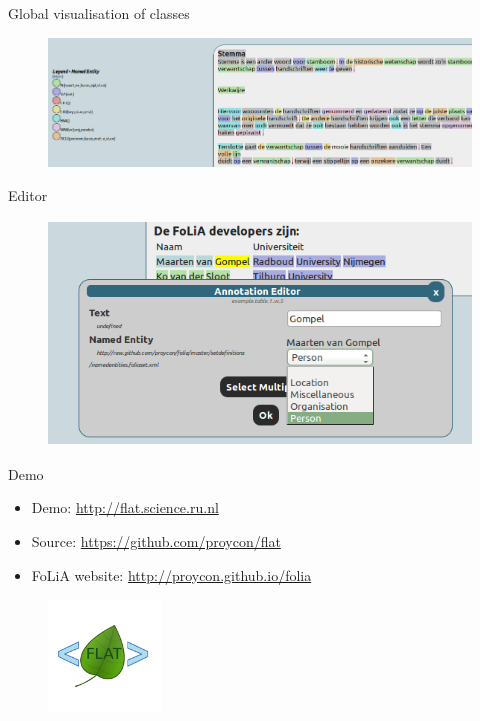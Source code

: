 \documentclass[xcolor=table,10pt,t]{beamer}
\begin{document}
\begin{frame}{Global visualisation of classes}
  \begin{figure}
        \includegraphics[width=15cm]{highlight2.png}
    \end{figure}
\end{frame}

\begin{frame}{Editor}
  \begin{figure}
        \includegraphics[height=6cm]{edit2.png}
    \end{figure}
\end{frame}

\begin{frame}{Demo}
  \begin{block}{}
      \begin{itemize}
        \item Demo: \url{http://flat.science.ru.nl}
        \item Source: \url{https://github.com/proycon/flat}
        \item FoLiA website: \url{http://proycon.github.io/folia}
      \end{itemize}

      \medskip
        \begin{figure}
          \includegraphics[height=3cm]{logo.png}
        \end{figure}
  \end{block}
\end{frame}
\end{document}
